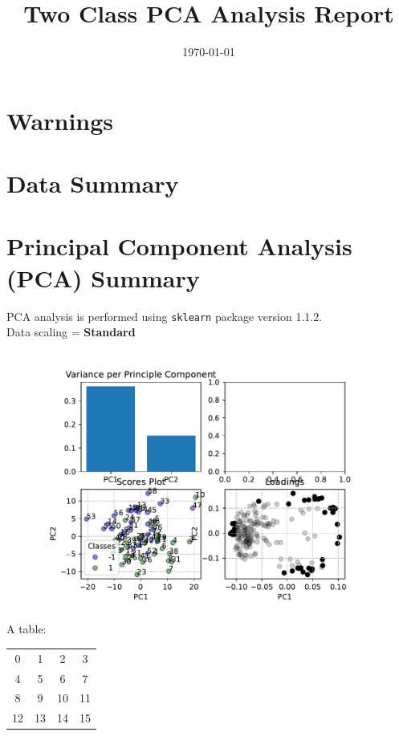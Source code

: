 \documentclass[]{article}
\title{Two Class PCA Analysis Report}
\author{}
\date{\today}
\begin{document}
\begin{titlepage}
    \maketitle
    \section*{Warnings}
    \section*{Data Summary}
\end{titlepage}

\section*{Principal Component Analysis (PCA) Summary}
    PCA analysis is performed using \texttt{sklearn} package version 1.1.2. \\
    Data scaling = \textbf{Standard}

    \begin{figure}[h!]
    \includegraphics{summary_figs.pdf}
    \end{figure}

A table:
\begin{tabular}{ c | c | c | c }
    0 & 1 & 2 & 3\\
    4 & 5 & 6 & 7\\
    8 & 9 & 10 & 11\\
    12 & 13 & 14 & 15
\end{tabular}
\end{document}
